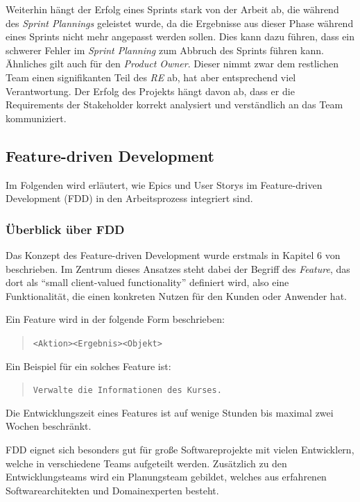 \documentclass[acmtog]{acmart}
\begin{document}
Weiterhin hängt der Erfolg eines Sprints stark von der Arbeit ab, die während des \emph{Sprint Plannings} geleistet wurde, da die Ergebnisse aus 
dieser Phase während eines Sprints nicht mehr angepasst werden sollen. Dies kann dazu führen, dass ein schwerer Fehler im \emph{Sprint Planning} zum 
Abbruch des Sprints führen kann. Ähnliches gilt auch für den \emph{Product Owner}. Dieser nimmt zwar dem restlichen Team einen signifikanten Teil 
des \emph{RE} ab, hat aber entsprechend viel Verantwortung. Der Erfolg des Projekts hängt davon ab, dass er die Requirements der Stakeholder korrekt 
analysiert und verständlich an das Team kommuniziert.

\subsection{Feature-driven Development}
Im Folgenden wird erläutert, wie Epics und User Storys im Feature-driven Development (FDD) in den Arbeitsprozess integriert sind.

\subsubsection{Überblick über FDD}
Das Konzept des Feature-driven Development wurde erstmals in Kapitel 6 von \cite{coad99} beschrieben.
Im Zentrum dieses Ansatzes steht dabei der Begriff des \emph{Feature}, das dort als ``small client-valued functionality'' definiert wird, also eine Funktionalität, die einen konkreten Nutzen für den Kunden oder Anwender hat.

Ein Feature wird in der folgende Form beschrieben:

\begin{quote}
	\texttt{<Aktion>\hspace{5ex}<Ergebnis>\hspace{5ex}<Objekt>}
\end{quote}

Ein Beispiel für ein solches Feature ist:

\begin{quote}
	\texttt{Verwalte die Informationen des Kurses.}
\end{quote}

Die Entwicklungszeit eines Features ist auf wenige Stunden bis maximal zwei Wochen beschränkt.

FDD eignet sich besonders gut für große Softwareprojekte mit vielen Entwicklern, welche in verschiedene Teams aufgeteilt werden.
Zusätzlich zu den Entwicklungsteams wird ein Planungsteam gebildet, welches aus erfahrenen Softwarearchitekten und Domainexperten besteht.
\end{document}
